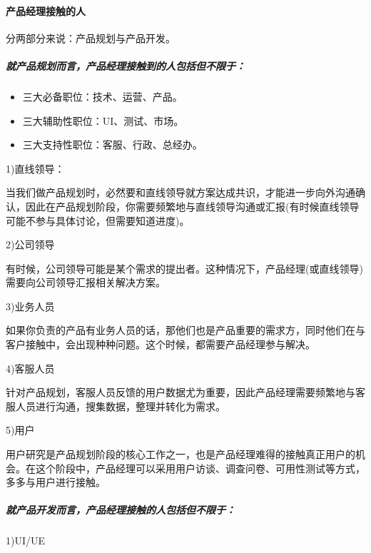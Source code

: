 \documentclass[letterpaper,10pt,english]{sphinxmanual}
\begin{document}
\paragraph{产品经理接触的人}
\label{\detokenize{chapter_introduction/PM:id29}}
分两部分来说：产品规划与产品开发。


\subparagraph{就产品规划而言，产品经理接触到的人包括但不限于：}
\label{\detokenize{chapter_introduction/PM:prod-people}}\label{\detokenize{chapter_introduction/PM:id30}}
%
\begin{footnote}[187]\sphinxAtStartFootnote
{}
%
\end{footnote}
\begin{itemize}
\item {} 
三大必备职位：技术、运营、产品。

\item {} 
三大辅助性职位：UI、测试、市场。

\item {} 
三大支持性职位：客服、行政、总经办。

\end{itemize}

1)直线领导：

当我们做产品规划时，必然要和直线领导就方案达成共识，才能进一步向外沟通确认，因此在产品规划阶段，你需要频繁地与直线领导沟通或汇报(有时候直线领导可能不参与具体讨论，但需要知道进度)。

2)公司领导

有时候，公司领导可能是某个需求的提出者。这种情况下，产品经理(或直线领导)需要向公司领导汇报相关解决方案。

3)业务人员

如果你负责的产品有业务人员的话，那他们也是产品重要的需求方，同时他们在与客户接触中，会出现种种问题。这个时候，都需要产品经理参与解决。

4)客服人员

针对产品规划，客服人员反馈的用户数据尤为重要，因此产品经理需要频繁地与客服人员进行沟通，搜集数据，整理并转化为需求。

5)用户

用户研究是产品规划阶段的核心工作之一，也是产品经理难得的接触真正用户的机会。在这个阶段中，产品经理可以采用用户访谈、调查问卷、可用性测试等方式，多多与用户进行接触。


\subparagraph{就产品开发而言，产品经理接触的人包括但不限于：}
\label{\detokenize{chapter_introduction/PM:id31}}
1)UI/UE
\end{document}
